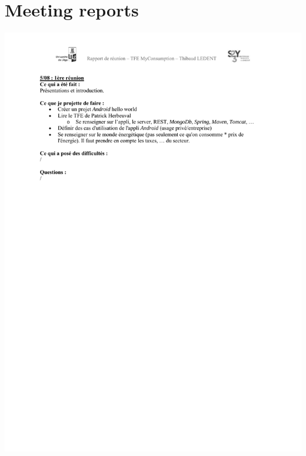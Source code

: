 \documentclass[a4paper, oneside, 11pt]{book}
\begin{document}
\chapter{Meeting reports}
\includegraphics[width=1\textwidth]{reports_NB_Part1.pdf}
\newpage
\end{document}

